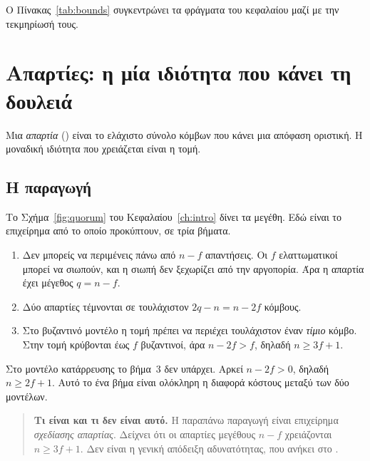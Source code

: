 Ο Πίνακας~\ref{tab:bounds} συγκεντρώνει τα φράγματα του κεφαλαίου μαζί
με την τεκμηρίωσή τους.

\section{Απαρτίες: η μία ιδιότητα που κάνει τη δουλειά}
\label{sec:quorums}

Μια \emph{απαρτία} () είναι το ελάχιστο σύνολο κόμβων που
κάνει μια απόφαση οριστική. Η μοναδική ιδιότητα που χρειάζεται είναι η
τομή.

\subsection{Η παραγωγή}

Το Σχήμα~\ref{fig:quorum} του Κεφαλαίου~\ref{ch:intro} δίνει τα μεγέθη.
Εδώ είναι το επιχείρημα από το οποίο προκύπτουν, σε τρία βήματα.

\begin{enumerate}
  \item Δεν μπορείς να περιμένεις πάνω από $n-f$ απαντήσεις. Οι $f$
  ελαττωματικοί μπορεί να σιωπούν, και η σιωπή δεν ξεχωρίζει από την
  αργοπορία. Άρα η απαρτία έχει μέγεθος $q = n-f$.
  \item Δύο απαρτίες τέμνονται σε τουλάχιστον $2q - n = n - 2f$ κόμβους.
  \item Στο βυζαντινό μοντέλο η τομή πρέπει να περιέχει τουλάχιστον έναν
  \emph{τίμιο} κόμβο. Στην τομή κρύβονται έως $f$ βυζαντινοί, άρα
  $n - 2f > f$, δηλαδή $n \ge 3f+1$.
\end{enumerate}

Στο μοντέλο κατάρρευσης το βήμα~3 δεν υπάρχει. Αρκεί $n - 2f > 0$,
δηλαδή $n \ge 2f+1$. Αυτό το ένα βήμα είναι ολόκληρη η διαφορά κόστους
μεταξύ των δύο μοντέλων.

\begin{quote}\small
\textbf{Τι είναι και τι δεν είναι αυτό.} Η παραπάνω παραγωγή είναι
επιχείρημα \emph{σχεδίασης απαρτίας}. Δείχνει ότι οι απαρτίες μεγέθους
$n-f$ χρειάζονται $n \ge 3f+1$. Δεν είναι η γενική απόδειξη
αδυνατότητας, που ανήκει στο \cite{pease1980reaching}.
\end{quote}

